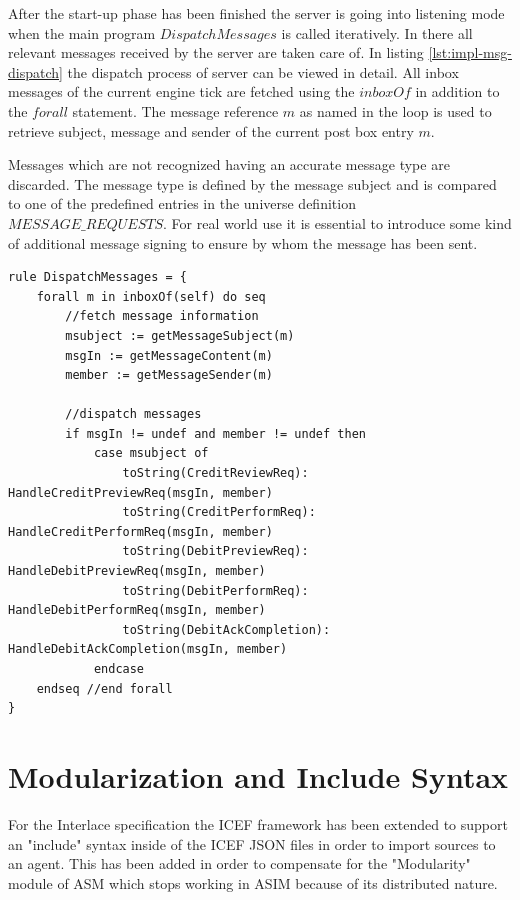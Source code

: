 After the start-up phase has been finished the server is going into listening mode when the main program $DispatchMessages$ is called iteratively. In there all relevant messages received by the server are taken care of. In listing \ref{lst:impl-msg-dispatch} the dispatch process of server can be viewed in detail. All inbox messages of the current engine tick are fetched using the $inboxOf$ in addition to the $forall$ statement. The message reference $m$ as named in the loop is used to retrieve subject, message and sender of the current post box entry $m$.

Messages which are not recognized having an accurate message type are discarded. The message type is defined by the message subject and is compared to one of the predefined entries in the universe definition $MESSAGE\_REQUESTS$. For real world use it is essential to introduce some kind of additional message signing to ensure by whom the message has been sent.

\begin{center}
\begin{minipage}{0.8\textwidth}
\small
\begin{lstlisting}[language=bsl_lst,caption={\bf\small Server message dispatching},label={lst:impl-msg-dispatch} ]
rule DispatchMessages = {
	forall m in inboxOf(self) do seq
		//fetch message information
		msubject := getMessageSubject(m)
		msgIn := getMessageContent(m)
		member := getMessageSender(m)
		
		//dispatch messages
		if msgIn != undef and member != undef then
			case msubject of
				toString(CreditReviewReq): HandleCreditPreviewReq(msgIn, member)
				toString(CreditPerformReq): HandleCreditPerformReq(msgIn, member)
				toString(DebitPreviewReq): HandleDebitPreviewReq(msgIn, member)
				toString(DebitPerformReq): HandleDebitPerformReq(msgIn, member)
				toString(DebitAckCompletion): HandleDebitAckCompletion(msgIn, member)
			endcase
	endseq //end forall
}
\end{lstlisting}
\end{minipage}
\end{center}

\section{Modularization and Include Syntax}
\label{sec:impl-include}

For the Interlace specification the ICEF framework has been extended to support an "include" syntax inside of the ICEF JSON files in order to import sources to an agent. This has been added in order to compensate for the "Modularity" module of ASM which stops working in ASIM because of its distributed nature.

